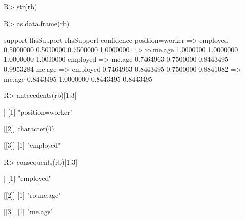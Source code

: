 \documentclass{article}\usepackage[]{graphicx}\usepackage[]{color}
\begin{document}
\begin{Schunk}
% --begin: "searchrules2"
\begin{Sinput}
R> str(rb)
\end{Sinput}
%
% --end: "searchrules2"
\end{Schunk}

\begin{Schunk}
% --begin: "searchrules3"
\begin{Sinput}
R> as.data.frame(rb)
\end{Sinput}
\begin{Soutput}
                              support lhsSupport rhsSupport confidence
position=worker => employed 0.5000000  0.5000000  0.7500000  1.0000000
 => ro.me.age               1.0000000  1.0000000  1.0000000  1.0000000
employed => me.age          0.7464963  0.7500000  0.8443495  0.9953284
me.age => employed          0.7464963  0.8443495  0.7500000  0.8841082
 => me.age                  0.8443495  1.0000000  0.8443495  0.8443495
\end{Soutput}
%
% --end: "searchrules3"
\end{Schunk}

\begin{Schunk}
% --begin: "searchrules4"
\begin{Sinput}
R> antecedents(rb)[1:3]
\end{Sinput}
\begin{Soutput}
[[1]]
[1] "position=worker"

[[2]]
character(0)

[[3]]
[1] "employed"
\end{Soutput}
\begin{Sinput}
R> consequents(rb)[1:3]
\end{Sinput}
\begin{Soutput}
[[1]]
[1] "employed"

[[2]]
[1] "ro.me.age"

[[3]]
[1] "me.age"
\end{Soutput}
%
% --end: "searchrules4"
\end{Schunk}
\end{document}
